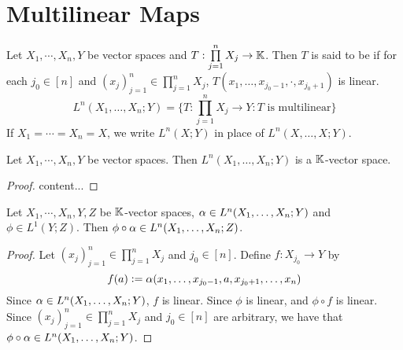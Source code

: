 \documentclass{book}
\begin{document}
\newpage
\section{Multilinear Maps}

\begin{defn}
	Let $X_1, \cdots, X_n, Y$ be vector spaces and $T: \prod\limits_{j=1}^n X_j \rightarrow \mathbb{K}$. Then $T$ is said to be  if for each $j_0 \in [n]$ and $(x_j)_{j=1}^n \in \prod\limits_{j=1}^n X_j$, $T(x_1, \ldots, x_{j_0 - 1}, \cdot, x_{j_0 + 1})$ is linear. $$L^n(X_1, \dots, X_n; Y) = \bigg\{T : \prod\limits_{j=1}^n X_j \rightarrow Y: T \text{ is multilinear}\bigg \}$$ 
	If $X_1 = \cdots = X_n = X$, we write $L^n(X;Y)$ in place of $L^n (X, \dots, X; Y) $. 
\end{defn}

\begin{defn}
\end{defn}

\begin{ex}
	Let $X_1, \cdots, X_n, Y$ be vector spaces. Then $L^n(X_1, \ldots, X_n;Y)$ is a $\mathbb{K}$-vector space.
\end{ex}

\begin{proof}
	content...
\end{proof}

\begin{ex}
	Let $X_1, \cdots, X_n, Y, Z$ be $\mathbb{K}$-vector spaces, $\alpha \in L^n(X_1, \ldots, X_n;Y)$ and $\phi \in L^1(Y;Z)$. Then $\phi \circ \alpha \in L^n(X_1, \ldots, X_n; Z)$. 
\end{ex}

\begin{proof}
	Let $(x_j)_{j=1}^n \in \prod\limits_{j=1}^n X_j$ and $j_0 \in [n]$. Define $f:X_{j_0} \rightarrow Y$ by 
	$$f(a) \vcentcolon= \alpha(x_1, \ldots, x_{j_0-1}, a , x_{j_0+1}, \ldots, x_n) $$
	Since $\alpha \in L^n(X_1, \ldots, X_n;Y)$, $f$ is linear. Since $\phi$ is linear, and $\phi \circ f$ is linear. Since $(x_j)_{j=1}^n \in \prod\limits_{j=1}^n X_j$ and $j_0 \in [n]$ are arbitrary, we have that $\phi \circ \alpha \in L^n(X_1, \ldots, X_n;Y)$. 
\end{proof}
\end{document}

